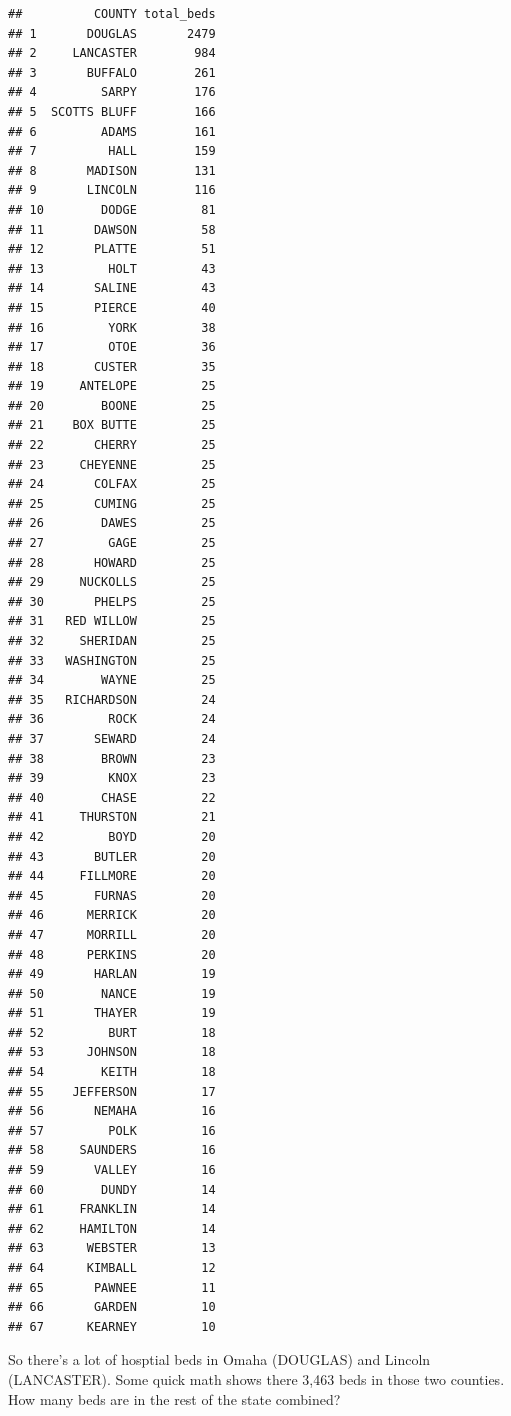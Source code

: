\documentclass[]{book}
\newenvironment{Shaded}{\begin{snugshade}}{\end{snugshade}}
\newcommand{\KeywordTok}[1]{\textcolor[rgb]{0.13,0.29,0.53}{\textbf{#1}}}
\newcommand{\NormalTok}[1]{#1}
\newcommand{\OperatorTok}[1]{\textcolor[rgb]{0.81,0.36,0.00}{\textbf{#1}}}
\newcommand{\StringTok}[1]{\textcolor[rgb]{0.31,0.60,0.02}{#1}}
\begin{document}
\begin{verbatim}
##          COUNTY total_beds
## 1       DOUGLAS       2479
## 2     LANCASTER        984
## 3       BUFFALO        261
## 4         SARPY        176
## 5  SCOTTS BLUFF        166
## 6         ADAMS        161
## 7          HALL        159
## 8       MADISON        131
## 9       LINCOLN        116
## 10        DODGE         81
## 11       DAWSON         58
## 12       PLATTE         51
## 13         HOLT         43
## 14       SALINE         43
## 15       PIERCE         40
## 16         YORK         38
## 17         OTOE         36
## 18       CUSTER         35
## 19     ANTELOPE         25
## 20        BOONE         25
## 21    BOX BUTTE         25
## 22       CHERRY         25
## 23     CHEYENNE         25
## 24       COLFAX         25
## 25       CUMING         25
## 26        DAWES         25
## 27         GAGE         25
## 28       HOWARD         25
## 29     NUCKOLLS         25
## 30       PHELPS         25
## 31   RED WILLOW         25
## 32     SHERIDAN         25
## 33   WASHINGTON         25
## 34        WAYNE         25
## 35   RICHARDSON         24
## 36         ROCK         24
## 37       SEWARD         24
## 38        BROWN         23
## 39         KNOX         23
## 40        CHASE         22
## 41     THURSTON         21
## 42         BOYD         20
## 43       BUTLER         20
## 44     FILLMORE         20
## 45       FURNAS         20
## 46      MERRICK         20
## 47      MORRILL         20
## 48      PERKINS         20
## 49       HARLAN         19
## 50        NANCE         19
## 51       THAYER         19
## 52         BURT         18
## 53      JOHNSON         18
## 54        KEITH         18
## 55    JEFFERSON         17
## 56       NEMAHA         16
## 57         POLK         16
## 58     SAUNDERS         16
## 59       VALLEY         16
## 60        DUNDY         14
## 61     FRANKLIN         14
## 62     HAMILTON         14
## 63      WEBSTER         13
## 64      KIMBALL         12
## 65       PAWNEE         11
## 66       GARDEN         10
## 67      KEARNEY         10
\end{verbatim}

So there's a lot of hosptial beds in Omaha (DOUGLAS) and Lincoln (LANCASTER). Some quick math shows there 3,463 beds in those two counties. How many beds are in the rest of the state combined?

\begin{Shaded}
\end{Shaded}
\end{document}
